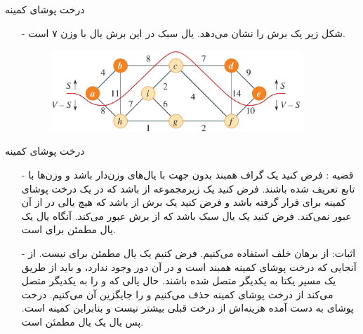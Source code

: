 \begin{frame}{‌درخت پوشای کمینه}
\begin{itemize}\itemr
\item[-]
شکل زیر یک برش را نشان می‌دهد.
یال سبک در این برش یال 
با وزن ۷ است.
\begin{figure}
\includegraphics[width=0.9\textwidth]{figs/chap07/588-cut}
\end{figure}
\end{itemize}
\end{frame}


\begin{frame}{‌درخت پوشای کمینه}
\begin{itemize}\itemr
\item[-]
قضیه : فرض کنید
یک گراف همبند بدون جهت با یال‌های وزن‌دار باشد و وزن‌ها با تابع
تعریف شده باشند. فرض کنید
یک زیرمجموعه از
باشد که در یک درخت پوشای کمینه برای
قرار گرفته باشد و فرض کنید
یک برش از
باشد که هیچ یالی در
از آن
عبور نمی‌کند. فرض کنید
یک یال سبک باشد که از برش
عبور می‌کند. آنگاه یال
یک یال مطمئن برای
است.
\item[-]
اثبات:
از برهان خلف استفاده می‌کنیم.
فرض کنیم 
یک یال مطمئن برای 
نیست.
از آنجایی که 
درخت پوشای کمینه همبند است و در آن دور وجود ندارد، 
و
باید از طریق یک مسیر یکتا به یکدیگر متصل شده باشند.
حال یالی که 
و
را به یکدیگر متصل می‌کند از درخت پوشای کمینه حذف می‌کنیم و 
را جایگزین آن می‌کنیم. درخت پوشای به دست آمده هزینه‌اش از درخت قبلی بیشتر نیست و بنابراین کمینه است. پس یال
یک یال مطمئن است.
\end{itemize}
\end{frame}


